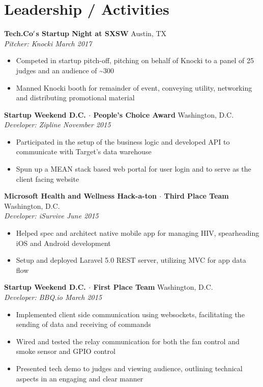 \documentclass[10pt]{article}
\begin{document}
\section*{Leadership / Activities}
\textbf{Tech.Co$\rq$s Startup Night at SXSW} \hfill Austin, TX\\
\textit{Pitcher: Knocki \hfill March 2017} \\
\vspace{-1em}
\begin{itemize}
  \item Competed in startup pitch-off, pitching on behalf of Knocki to a panel of 25 judges and an audience of {\textasciitilde{}}300
  \item Manned Knocki booth for remainder of event, conveying utility, networking and distributing promotional material
\end{itemize}
\textbf{Startup Weekend D.C. $\cdot$ People's Choice Award} \hfill Washington, D.C. \\
\textit{Developer: Zipline \hfill November 2015} \\
\vspace{-1em}
\begin{itemize}
  \item Participated in the setup of the business logic and developed API to communicate with Target's data warehouse
  \item Spun up a MEAN stack based web portal for user login and to serve as the client facing website
\end{itemize}
\textbf{Microsoft Health and Wellness Hack-a-ton $\cdot$ Third Place Team} \hfill Washington, D.C. \\
\textit{Developer: iSurvive \hfill June 2015} \\
\vspace{-1em}
\begin{itemize}
  \item Helped spec and architect native mobile app for managing HIV, spearheading iOS and Android development
  \item Setup and deployed Laravel 5.0 REST server, utilizing MVC for app data flow
\end{itemize}
\textbf{Startup Weekend D.C. $\cdot$ First Place Team} \hfill Washington, D.C. \\
\textit{Developer: BBQ.io \hfill March 2015} \\
\vspace{-1em}
\begin{itemize}
  \item Implemented client side communication using websockets, facilitating the sending of data and receiving of commands
  \item Wired and tested the relay communication for both the fan control and smoke sensor and GPIO control
  \item Presented tech demo to judges and viewing audience, outlining technical aspects in an engaging and clear manner
\end{itemize}
\end{document}

